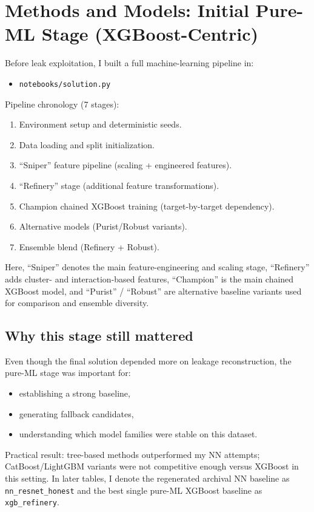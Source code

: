 \section{Methods and Models: Initial Pure-ML Stage (XGBoost-Centric)}

Before leak exploitation, I built a full machine-learning pipeline in:
\begin{itemize}[leftmargin=1.5em]
  \item \texttt{notebooks/solution.py}
\end{itemize}

Pipeline chronology (7 stages):
\begin{enumerate}[leftmargin=1.5em]
  \item Environment setup and deterministic seeds.
  \item Data loading and split initialization.
  \item ``Sniper'' feature pipeline (scaling + engineered features).
  \item ``Refinery'' stage (additional feature transformations).
  \item Champion chained XGBoost training (target-by-target dependency).
  \item Alternative models (Purist/Robust variants).
  \item Ensemble blend (Refinery + Robust).
\end{enumerate}
Here, ``Sniper'' denotes the main feature-engineering and scaling stage, ``Refinery'' adds cluster- and interaction-based features, ``Champion'' is the main chained XGBoost model, and ``Purist'' / ``Robust'' are alternative baseline variants used for comparison and ensemble diversity.

\subsection{Why this stage still mattered}
Even though the final solution depended more on leakage reconstruction, the pure-ML stage was important for:
\begin{itemize}[leftmargin=1.5em]
  \item establishing a strong baseline,
  \item generating fallback candidates,
  \item understanding which model families were stable on this dataset.
\end{itemize}

Practical result: tree-based methods outperformed my NN attempts; CatBoost/LightGBM variants were not competitive enough versus XGBoost in this setting.
In later tables, I denote the regenerated archival NN baseline as \texttt{nn\_resnet\_honest} and the best single pure-ML XGBoost baseline as \texttt{xgb\_refinery}.

